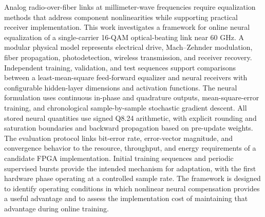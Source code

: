 Analog radio-over-fiber links at millimeter-wave frequencies require equalization methods that address component nonlinearities while supporting practical receiver implementation. This work investigates a framework for online neural equalization of a single-carrier 16-QAM optical-beating link near 60 GHz. A modular physical model represents electrical drive, Mach--Zehnder modulation, fiber propagation, photodetection, wireless transmission, and receiver recovery. Independent training, validation, and test sequences support comparisons between a least-mean-square feed-forward equalizer and neural receivers with configurable hidden-layer dimensions and activation functions. The neural formulation uses continuous in-phase and quadrature outputs, mean-square-error training, and chronological sample-by-sample stochastic gradient descent. All stored neural quantities use signed Q8.24 arithmetic, with explicit rounding and saturation boundaries and backward propagation based on pre-update weights. The evaluation protocol links bit-error rate, error-vector magnitude, and convergence behavior to the resource, throughput, and energy requirements of a candidate FPGA implementation. Initial training sequences and periodic supervised bursts provide the intended mechanism for adaptation, with the first hardware phase operating at a controlled sample rate. The framework is designed to identify operating conditions in which nonlinear neural compensation provides a useful advantage and to assess the implementation cost of maintaining that advantage during online training.
